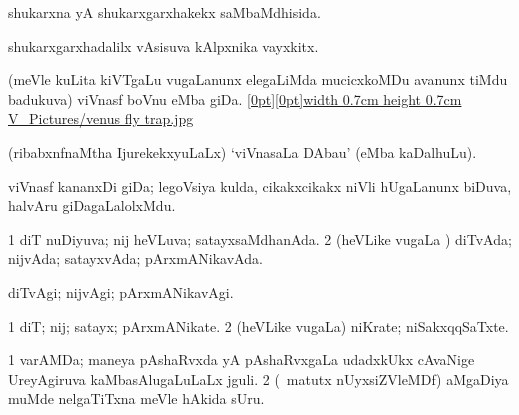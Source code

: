 {\bentry
{} 
\gl{\gu}
\expl{}
\bmng
 shukarxna yA shukarxgarxhakekx saMbaMdhisida. 
\emng
\eentry

\bentry
{} 
\gl{\nA}
\expl{}
\bmng
 shukarxgarxhadalilx vAsisuva kAlpxnika vayxkitx. 
\emng
\eentry

\bentry
{} 
\gl{\nA}
\expl{}
\bmng
\emng
\eentry

\bentry
{}
\gl{\nA}
\bmng
 (meVle kuLita kiVTgaLu \mo vugaLanunx elegaLiMda mucicxkoMDu avanunx tiMdu badukuva) viVnasf boVnu eMba giDa. \quad \hyperlink{venus fly trapfigure}{\raisebox{-0.20cm}[0pt][0pt]{\pdfimage width 0.7cm height 0.7cm {V_Pictures/venus fly trap.jpg}}} 
\emng
\eentry

\bentry
{}
\gl{\nA}
\expl{}
\bmng
 (ribabxnfnaMtha IjurekekxyuLaLx) `viVnasaLa DAbau' (eMba kaDalhuLu). 
\emng
\eentry

\bentry
{}
\gl{\nA}
\expl{}
\bmng
 viVnasf kananxDi giDa; legoVsiya kulda, cikakxcikakx niVli hUgaLanunx biDuva, halvAru giDagaLalolxMdu. 
\emng
\eentry

\bentry
{}
\gl{\nA}
\expl{}
\bmng
\emng
\eentry

\bentry
{} 
\gl{\gu}
\expl{}
\bmng
\bnum
\num{1} diT nuDiyuva; nij heVLuva; satayxsaMdhanAda. 
\num{2} (heVLike \mo vugaLa \vi) diTvAda; nijvAda; satayxvAda; pArxmANikavAda. 
\enum
\emng
\eentry

\bentry
{} 
\gl{\kirxvi}
\expl{}
\bmng
 diTvAgi; nijvAgi; pArxmANikavAgi. 
\emng
\eentry

\bentry
{} 
\gl{\nA}
\expl{}
\bmng
\emng
\eentry

\bentry
{} 
\gl{\nA}
\expl{}
\bmng
\bnum
\num{1} diT; nij; satayx; pArxmANikate. 
\num{2} (heVLike \mo vugaLa) niKrate; niSakxqqSaTxte. 
\enum
\emng
\eentry

\bentry
{} 
\gl{\nA}
\expl{}
\bmng
\bnum
\num{1} varAMDa; maneya pAshaRvxda yA pAshaRvxgaLa udadxkUkx cAvaNige UreyAgiruva kaMbasAlugaLuLaLx jguli. 
\num{2} (\AseTxrXV\ matutx nUyxsiZVleMDf) aMgaDiya muMde nelgaTiTxna meVle hAkida sUru. 
\enum
\emng
\eentry

}
